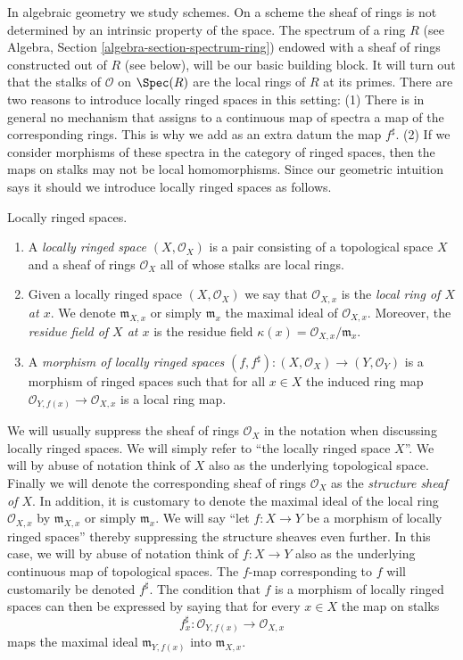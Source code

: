 \medskip\noindent
In algebraic geometry we study schemes. On a scheme the sheaf of rings
is not determined by an intrinsic property of the space.
The spectrum of a ring $R$
(see Algebra, Section \ref{algebra-section-spectrum-ring}) endowed
with a sheaf of rings constructed out of $R$ (see below),
will be our basic building block. It will turn out that
the stalks of $\mathcal{O}$ on $\Spec(R)$ are the local
rings of $R$ at its primes. There are two reasons to introduce
locally ringed spaces in this setting: (1) There is in general
no mechanism that assigns to a continuous map of spectra a
map of the corresponding rings. This is why we add as an extra datum
the map $f^\sharp$. (2) If we consider morphisms
of these spectra in the category of ringed spaces, then the
maps on stalks may not be local homomorphisms. Since our
geometric intuition says it should we introduce locally ringed spaces
as follows.

\begin{definition}
\label{definition-locally-ringed-space}
Locally ringed spaces.
\begin{enumerate}
\item A {\it locally ringed space $(X, \mathcal{O}_X)$}
is a pair consisting of a
topological space $X$ and a sheaf of rings $\mathcal{O}_X$ all of whose stalks
are local rings.
\item Given a locally ringed space $(X, \mathcal{O}_X)$ we say that
$\mathcal{O}_{X, x}$ is the {\it local ring of $X$ at $x$}.
We denote $\mathfrak{m}_{X, x}$ or simply $\mathfrak{m}_x$
the maximal ideal of $\mathcal{O}_{X, x}$. Moreover, the
{\it residue field of $X$ at $x$} is the residue field
$\kappa(x) = \mathcal{O}_{X, x}/\mathfrak{m}_x$.
\item A {\it morphism of locally ringed spaces}
$(f, f^\sharp) : (X, \mathcal{O}_X) \to (Y, \mathcal{O}_Y)$
is a morphism of ringed spaces such that for all $x \in X$
the induced ring map $\mathcal{O}_{Y, f(x)} \to \mathcal{O}_{X, x}$ is a
local ring map.
\end{enumerate}
\end{definition}

\noindent
We will usually suppress the sheaf of rings $\mathcal{O}_X$
in the notation when discussing locally ringed spaces. We will
simply refer to ``the locally ringed space $X$''.
We will by abuse of notation think of $X$ also as
the underlying topological space. Finally we will denote
the corresponding sheaf of rings
$\mathcal{O}_X$ as the {\it structure sheaf of $X$}.
In addition, it is customary to denote the maximal ideal
of the local ring $\mathcal{O}_{X, x}$ by
$\mathfrak{m}_{X, x}$ or simply $\mathfrak{m}_x$.
We will say ``let $f : X \to Y$ be a morphism of locally ringed
spaces'' thereby suppressing the structure sheaves even further.
In this case, we will by abuse of notation think of $f : X\to Y$
also as the underlying continuous map of topological spaces.
The $f$-map corresponding to $f$ will customarily
be denoted $f^\sharp$. The condition that $f$ is a morphism
of locally ringed spaces can then be expressed by saying that
for every $x\in X$ the map on stalks
$$
f^\sharp_x : \mathcal{O}_{Y, f(x)} \longrightarrow \mathcal{O}_{X, x}
$$
maps the maximal ideal $\mathfrak m_{Y, f(x)}$ into
$\mathfrak m_{X, x}$.

